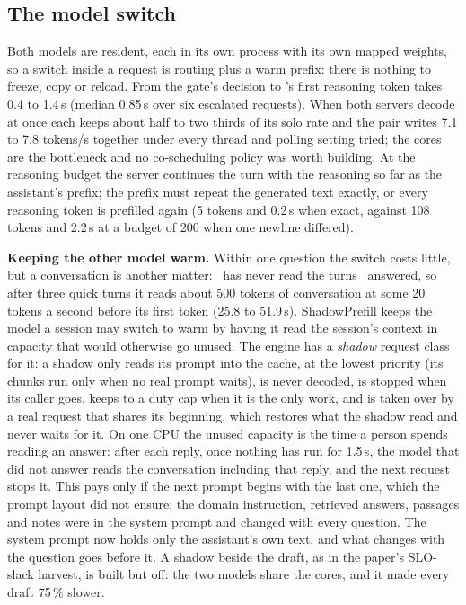 \subsection{The model switch}
Both models are resident, each in its own process with its own mapped
weights, so a switch inside a request is routing plus a warm prefix: there is
nothing to freeze, copy or reload. From the gate's decision to \Stwo's first
reasoning token takes 0.4 to 1.4\,s (median 0.85\,s over six escalated
requests). When both servers decode at once each keeps about half to two
thirds of its solo rate and the pair writes 7.1 to 7.8 tokens/s together
under every thread and polling setting tried; the cores are the bottleneck
and no co-scheduling policy was worth building. At the reasoning budget the
server continues the turn with the reasoning so far as the assistant's
prefix; the prefix must repeat the generated text exactly, or every reasoning
token is prefilled again (5 tokens and 0.2\,s when exact, against 108 tokens
and 2.2\,s at a budget of 200 when one newline differed).

\textbf{Keeping the other model warm.} Within one question the switch costs
little, but a conversation is another matter: \Stwo\ has never read the turns
\Sone\ answered, so after three quick turns it reads about 500 tokens of
conversation at some 20 tokens a second before its first token (25.8 to
51.9\,s). ShadowPrefill \cite{qiu2026shadowprefill} keeps the model a session
may switch to warm by having it read the session's context in capacity that
would otherwise go unused. The engine has a \emph{shadow} request class for
it: a shadow only reads its prompt into the cache, at the lowest priority
(its chunks run only when no real prompt waits), is never decoded, is
stopped when its caller goes, keeps to a duty cap when it is the only work,
and is taken over by a real request that shares its beginning, which
restores what the shadow read and never waits for it. On one CPU the unused
capacity is the time a person spends reading an answer: after each reply,
once nothing has run for 1.5\,s, the model that did not answer reads the
conversation including that reply, and the next request stops it. This pays
only if the next prompt begins with the last one, which the prompt layout did
not ensure: the domain instruction, retrieved answers, passages and notes
were in the system prompt and changed with every question. The system prompt
now holds only the assistant's own text, and what changes with the question
goes before it. A shadow beside the draft, as in the paper's
SLO-slack harvest, is built but off: the two models share the cores, and it
made every draft 75\,\% slower.

